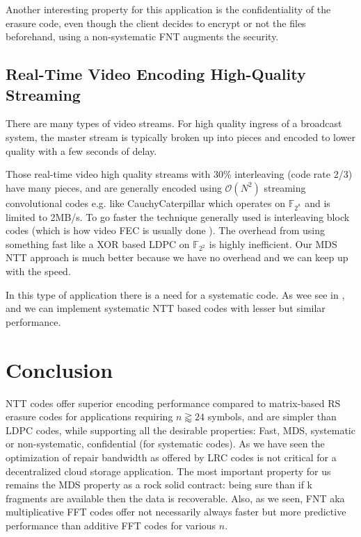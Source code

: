 \documentclass[oneside,9pt]{article}
\newcommand{\bigo}[1]{ \mathcal{O}(#1) }
\newcommand{\gf}[2][]{ \mathbb{F}_{{#2}^{#1}} }
\begin{document}
Another interesting property for this application is the confidentiality of the erasure code, even though the client decides to encrypt or not the files beforehand, using a non-systematic FNT augments the security.

\subsection{Real-Time Video Encoding High-Quality Streaming}

There are many types of video streams. For high quality ingress of a broadcast system, the master stream is typically broken up into pieces and encoded to lower quality with a few seconds of delay.

Those real-time video high quality streams with 30\% interleaving (code rate 2/3) have many pieces, and are generally encoded using $\bigo{N^2}$ streaming convolutional codes e.g. like CauchyCaterpillar \cite{cauchycaterpillar} which operates on  $\gf{2^8}$ and is limited to 2MB/s. To go faster the technique generally used is interleaving block codes (which is how video FEC is usually done \cite{al_fec}). The overhead from using something fast like a XOR based LDPC on $\gf{2^2}$ is highly inefficient. Our MDS NTT approach is much better because we have no overhead and we can keep up with the speed.

In this type of application there is a need for a systematic code. As wee see in \cite{leopard}, \cite{fft_add_chung} and \cite{fnt_lacan} we can implement systematic NTT based codes with lesser but similar performance.

\section{Conclusion}

NTT codes offer superior encoding performance compared to matrix-based RS erasure codes for applications requiring $n \gtrapprox 24$ symbols, and are simpler than LDPC codes, while supporting all the desirable properties: Fast, MDS, systematic or non-systematic, confidential (for systematic codes). As we have seen the optimization of repair bandwidth as offered by LRC codes is not critical for a decentralized cloud storage application. The most important property for us remains the MDS property as a rock solid contract: being sure than if k fragments are available then the data is recoverable. Also, as we seen, FNT aka multiplicative FFT codes offer not necessarily always faster but more predictive performance than additive FFT codes for various $n$. 
\end{document}
